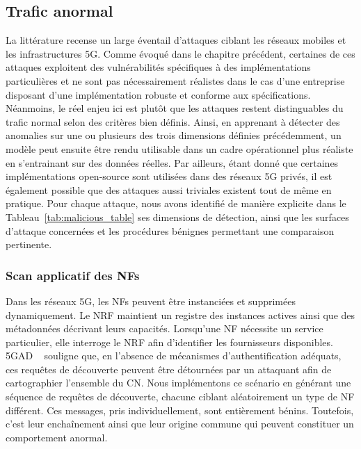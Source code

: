 \documentclass[a4paper,11pt,twoside]{StyleThese}
\begin{document}
\subsection{Trafic anormal}
La littérature recense un large éventail d’attaques ciblant les réseaux mobiles et les infrastructures 5G. Comme évoqué dans le chapitre précédent, certaines de ces attaques exploitent des vulnérabilités spécifiques à des implémentations particulières et ne sont pas nécessairement réalistes dans le cas d’une entreprise disposant d’une implémentation robuste et conforme aux spécifications. Néanmoins, le réel enjeu ici est plutôt que les attaques restent distinguables du trafic normal selon des critères bien définis. Ainsi, en apprenant à détecter des anomalies sur une ou plusieurs des trois dimensions définies précédemment, un modèle peut ensuite être rendu utilisable dans un cadre opérationnel plus réaliste en s'entrainant sur des données réelles. Par ailleurs, étant donné que certaines implémentations open-source sont utilisées dans des réseaux 5G privés, il est également possible que des attaques aussi triviales existent tout de même en pratique. Pour chaque attaque, nous avons identifié de manière explicite dans le Tableau~\ref{tab:malicious_table} ses dimensions de détection, ainsi que les surfaces d’attaque concernées et les procédures bénignes permettant une comparaison pertinente.

\subsubsection{Scan applicatif des NFs} 
Dans les réseaux 5G, les NFs peuvent être instanciées et supprimées dynamiquement. Le NRF maintient un registre des instances actives ainsi que des métadonnées décrivant leurs capacités. Lorsqu’une NF nécessite un service particulier, elle interroge le NRF afin d’identifier les fournisseurs disponibles. 5GAD ~\cite{5gad} souligne que, en l’absence de mécanismes d’authentification adéquats, ces requêtes de découverte peuvent être détournées par un attaquant afin de cartographier l’ensemble du CN. Nous implémentons ce scénario en générant une séquence de requêtes de découverte, chacune ciblant aléatoirement un type de NF différent. Ces messages, pris individuellement, sont entièrement bénins. Toutefois, c’est leur enchaînement ainsi que leur origine commune qui peuvent constituer un comportement anormal.
\end{document}
